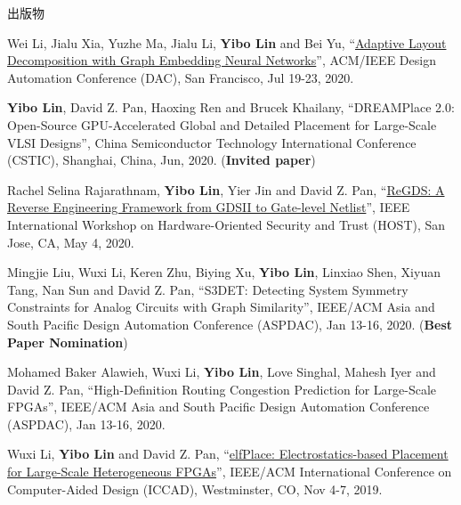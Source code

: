 \begin{rSection}{出版物}
\begin{description}[font=\normalfont, rightmargin=2em]
\item[{[C38]}]{
        Wei Li, Jialu Xia, Yuzhe Ma, Jialu Li, \textbf{Yibo Lin} and Bei Yu, 
    ``\href{https://doi.org/10.1109/DAC18072.2020.9218706}{Adaptive Layout Decomposition with Graph Embedding Neural Networks}'', 
    ACM/IEEE Design Automation Conference (DAC), San Francisco, Jul 19-23, 2020.
    
}
            

\item[{[C37]}]{
        \textbf{Yibo Lin}, David Z. Pan, Haoxing Ren and Brucek Khailany, 
    ``DREAMPlace 2.0: Open-Source GPU-Accelerated Global and Detailed Placement for Large-Scale VLSI Designs'', 
    China Semiconductor Technology International Conference (CSTIC), Shanghai, China, Jun, 2020.
    (\textbf{Invited paper})
}
            

\item[{[C36]}]{
        Rachel Selina Rajarathnam, \textbf{Yibo Lin}, Yier Jin and David Z. Pan, 
    ``\href{https://doi.org/10.1109/HOST45689.2020.9300272}{ReGDS: A Reverse Engineering Framework from GDSII to Gate-level Netlist}'', 
    IEEE International Workshop on Hardware-Oriented Security and Trust (HOST), San Jose, CA, May 4, 2020.
    
}
            

\item[{[C35]}]{
        Mingjie Liu, Wuxi Li, Keren Zhu, Biying Xu, \textbf{Yibo Lin}, Linxiao Shen, Xiyuan Tang, Nan Sun and David Z. Pan, 
    ``S3DET: Detecting System Symmetry Constraints for Analog Circuits with Graph Similarity'', 
    IEEE/ACM Asia and South Pacific Design Automation Conference (ASPDAC), Jan 13-16, 2020.
    (\textbf{Best Paper Nomination})
}
            

\item[{[C34]}]{
        Mohamed Baker Alawieh, Wuxi Li, \textbf{Yibo Lin}, Love Singhal, Mahesh Iyer and David Z. Pan, 
    ``High-Definition Routing Congestion Prediction for Large-Scale FPGAs'', 
    IEEE/ACM Asia and South Pacific Design Automation Conference (ASPDAC), Jan 13-16, 2020.
    
}
            

\item[{[C33]}]{
        Wuxi Li, \textbf{Yibo Lin} and David Z. Pan, 
    ``\href{https://doi.org/10.1109/ICCAD45719.2019.8942075}{elfPlace: Electrostatics-based Placement for Large-Scale Heterogeneous FPGAs}'', 
    IEEE/ACM International Conference on Computer-Aided Design (ICCAD), Westminster, CO, Nov 4-7, 2019.
    
}
\end{description}
\end{rSection}
